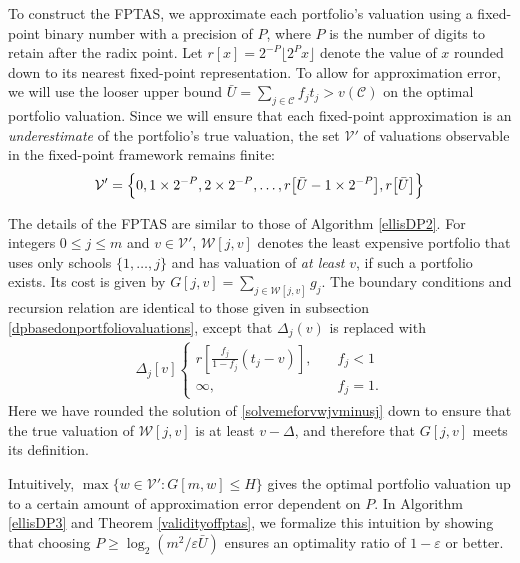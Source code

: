 To construct the FPTAS, we approximate each portfolio's valuation using a fixed-point binary number with a precision of $P$, where $P$ is the number of digits to retain after the radix point. Let $r[x] =  2^{-P}\lfloor 2^P x \rfloor$ denote the value of $x$ rounded down to its nearest fixed-point representation. To allow for approximation error, we will use the looser upper bound $\bar U = \sum_{j\in \mathcal{C}} f_j t_j > v(\mathcal{C})$ on the optimal portfolio valuation. Since we will ensure that each fixed-point approximation is an \emph{underestimate} of the portfolio's true valuation, the set $\mathcal{V}'$ of valuations observable in the fixed-point framework remains finite:
\begin{equation}
\mathcal{V}' = \Bigl\{0, 1\times 2^{-P}, 2\times 2^{-P}, \dots, r\bigl[\bar U- 1\times 2^{-P}\bigr], r\bigl[\bar U\bigr]\Bigr\}
\end{equation}


The details of the FPTAS are similar to those of Algorithm \ref{ellisDP2}. For integers $0 \leq j \leq m$ and $v \in \mathcal{V}'$, $\mathcal{W}[j, v]$ denotes the least expensive portfolio that uses only schools $\{ 1, \dots, j\}$ and has valuation of \emph{at least} $v$, if such a portfolio exists. Its cost is given by $G[j, v] = \sum_{j\in \mathcal{W}[j, v]} g_j$. The boundary conditions and recursion relation are identical to those given in subsection \ref{dpbasedonportfoliovaluations}, except that $\Delta_j(v)$ is replaced with
\begin{align}
\Delta_j[v]
\begin{cases}
r\left[\frac{f_j}{1 - f_j} (t_j - v)\right], \quad & f_j < 1\\
\infty, &f_j = 1.
\end{cases} \label{clampeddeltajvdef}
\end{align}
Here we have rounded the solution of \eqref{solvemeforvwjvminusj} down to ensure that the true valuation of $\mathcal{W}[j, v]$ is at least $v - \Delta$, and therefore that $G[j, v]$ meets its definition.

Intuitively, $\max\{ w \in \mathcal{V}': G[m, w] \leq H\}$ gives the optimal portfolio valuation up to a certain amount of approximation error dependent on $P$. In Algorithm \ref{ellisDP3} and Theorem \ref{validityoffptas}, we formalize this intuition by showing that choosing $P \geq \log_{2}\left(m^2 / \varepsilon \bar U\right)$ ensures an optimality ratio of $1 - \varepsilon$ or better.

